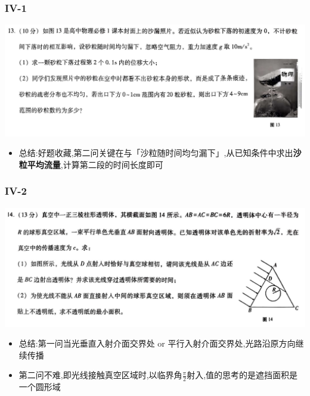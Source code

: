 \documentclass{article}
\begin{document}
    \subsubsection{IV-1}
    \includegraphics[width=50em,keepaspectratio]{./pictures/1.3-4.png}

    \begin{itemize}
        \item 总结:好题收藏,第二问关键在与「沙粒随时间均匀漏下」,从已知条件中求出\textbf{沙粒平均流量},计算第二段的时间长度即可
    \end{itemize}

    
    \subsubsection{IV-2}
    \includegraphics[width=50em,keepaspectratio]{./pictures/1.3-5.png}
    
    \begin{itemize}
        \item 总结:第一问当光垂直入射介面交界处 or 平行入射介面交界处,光路沿原方向继续传播
        \item 第二问不难,即光线接触真空区域时,以临界角$\frac{\pi}{2}$射入,值的思考的是遮挡面积是一个圆形域
    \end{itemize}

        
\end{document}
